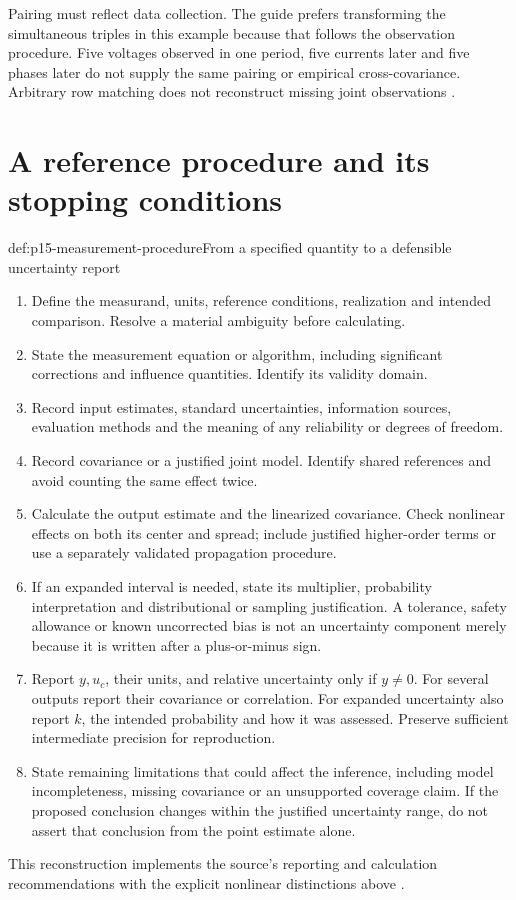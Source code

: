 Pairing must reflect data collection. The guide prefers transforming the
simultaneous triples in this example because that follows the observation
procedure. Five voltages observed in one period, five currents later and five
phases later do not supply the same pairing or empirical cross-covariance.
Arbitrary row matching does not reconstruct missing joint observations
\cite[4.1.4, H.2.4]{JCGM1002008EMeasurement}.

\section{A reference procedure and its stopping conditions}
\label{sec:p15-measurement-procedure}

\begin{hbmethod}{def:p15-measurement-procedure}{From a specified quantity to a defensible uncertainty report}
\begin{enumerate}
\item Define the measurand, units, reference conditions, realization and
intended comparison. Resolve a material ambiguity before calculating.
\item State the measurement equation or algorithm, including significant
corrections and influence quantities. Identify its validity domain.
\item Record input estimates, standard uncertainties, information sources,
evaluation methods and the meaning of any reliability or degrees of freedom.
\item Record covariance or a justified joint model. Identify shared
references and avoid counting the same effect twice.
\item Calculate the output estimate and the linearized covariance.
Check nonlinear effects on both its center and spread; include justified
higher-order terms or use a separately validated propagation procedure.
\item If an expanded interval is needed, state its multiplier, probability
interpretation and distributional or sampling justification. A tolerance,
safety allowance or known uncorrected bias is not an uncertainty component
merely because it is written after a plus-or-minus sign.
\item Report \(y,u_c\), their units, and relative uncertainty only if
\(y\ne0\). For several outputs report their covariance or correlation.
For expanded uncertainty also report \(k\), the intended probability and how
it was assessed. Preserve sufficient intermediate precision for reproduction.
\item State remaining limitations that could affect the inference, including
model incompleteness, missing covariance or an unsupported coverage claim.
If the proposed conclusion changes within the justified uncertainty range,
do not assert that conclusion from the point estimate alone.
\end{enumerate}
This reconstruction implements the source's reporting and calculation
recommendations with the explicit nonlinear distinctions above
\cite[7--8]{JCGM1002008EMeasurement}.
\end{hbmethod}

